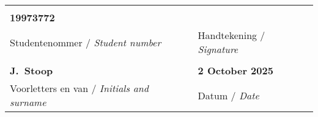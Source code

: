 \vfill

\noindent \begin{tabularx}{1.0\linewidth}{|L|L|}
    \hline
	& \\[-10pt]
    \textbf{19973772} \\
    {Studentenommer / \textit{Student number}} & {Handtekening / \textit{Signature}} \\
    \hline
    & \\[-10pt]
    \textbf{J.\ Stoop} & \textbf{2 October 2025} \\
    {Voorletters en van / \textit{Initials and surname}} & {Datum / \textit{Date}} \\
    \hline
\end{tabularx}

\vspace{15pt}

